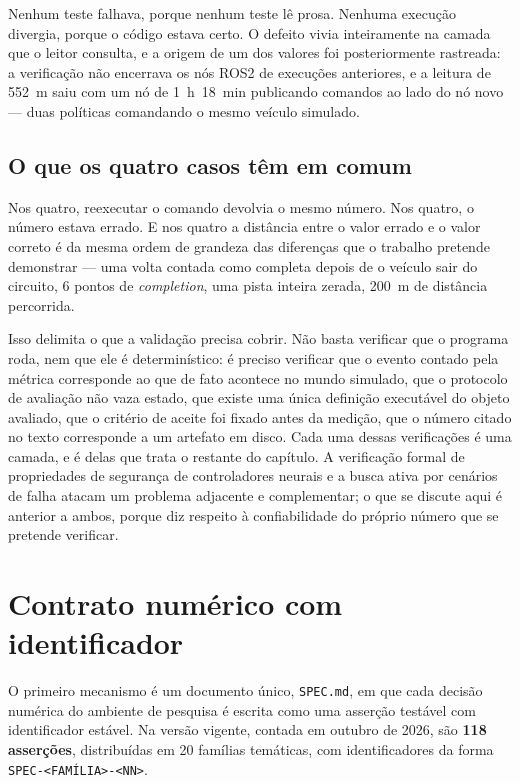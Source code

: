 Nenhum teste falhava, porque nenhum teste lê prosa. Nenhuma execução divergia,
porque o código estava certo. O defeito vivia inteiramente na camada que o leitor
consulta, e a origem de um dos valores foi posteriormente rastreada: a
verificação não encerrava os nós ROS2 de execuções anteriores, e a leitura de 552~m
saiu com um nó de 1~h~18~min publicando comandos ao lado do nó novo --- duas
políticas comandando o mesmo veículo simulado.

\subsection{O que os quatro casos têm em comum}

Nos quatro, reexecutar o comando devolvia o mesmo número. Nos quatro, o número
estava errado. E nos quatro a distância entre o valor errado e o valor correto é da
mesma ordem de grandeza das diferenças que o trabalho pretende demonstrar --- uma
volta contada como completa depois de o veículo sair do circuito, 6 pontos de
\textit{completion}, uma pista inteira zerada, 200~m de distância percorrida.

Isso delimita o que a validação precisa cobrir. Não basta verificar que o
programa roda, nem que ele é determinístico: é preciso verificar que o evento
contado pela métrica corresponde ao que de fato acontece no mundo simulado, que o
protocolo de avaliação não vaza estado, que existe uma única definição executável
do objeto avaliado, que o critério de aceite foi fixado antes da medição, que o
número citado no texto corresponde a um artefato em disco. Cada uma dessas verificações é uma camada, e é
delas que trata o restante do capítulo. A verificação formal de propriedades de
segurança de controladores neurais \cite{Ivanov2020Verifying} e a busca ativa por
cenários de falha \cite{Bak2021Stress} atacam um problema adjacente e
complementar; o que se discute aqui é anterior a ambos, porque diz respeito à
confiabilidade do próprio número que se pretende verificar.

\section{Contrato numérico com identificador}\label{sec:val-contrato}

O primeiro mecanismo é um documento único, \texttt{SPEC.md}, em que cada decisão
numérica do ambiente de pesquisa é escrita como uma asserção testável com
identificador estável. Na versão vigente, contada em outubro de 2026, são
\textbf{118 asserções}, distribuídas em 20 famílias temáticas, com
identificadores da forma \texttt{SPEC-<FAMÍLIA>-<NN>}.

